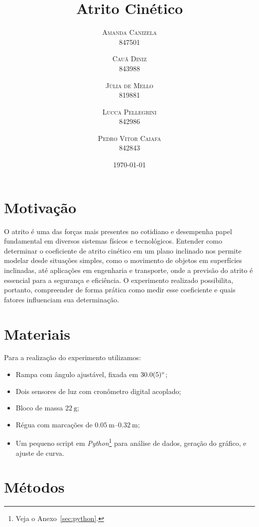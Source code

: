\documentclass[10pt,twoside,twocolumn]{article} %
\title{Atrito Cinético}
\author{
        \textsc{Amanda Canizela} \\[1ex] %
        \normalsize{847501}
        \and %
        \textsc{Cauã Diniz} \\[1ex]
        \normalsize{843988}
        \and
        \textsc{Júlia de Mello} \\[1ex]
        \normalsize{819881}
        \and
        \textsc{Lucca Pellegrini} \\[1ex]
        \normalsize{842986}
        \and
        \textsc{Pedro Vitor Caiafa} \\[1ex]
        \normalsize{842843}
}
\date{\today} %
\begin{document}


\maketitle


\section{Motivação}

O atrito é uma das forças mais presentes no cotidiano e desempenha papel
fundamental em diversos sistemas físicos e tecnológicos. Entender como
determinar o coeficiente de atrito cinético em um plano inclinado nos permite
modelar desde situações simples, como o movimento de objetos em superfícies
inclinadas, até aplicações em engenharia e transporte, onde a previsão do
atrito é essencial para a segurança e eficiência. O experimento realizado
possibilita, portanto, compreender de forma prática como medir esse coeficiente
e quais fatores influenciam sua determinação.

\section{Materiais}

Para a realização do experimento utilizamos:

\begin{itemize}
    \item Rampa com ângulo ajustável, fixada em $\SI{30 \pm 0.5}{\degree}$;
    \item Dois sensores de luz com cronômetro digital acoplado;
    \item Bloco de massa $\SI{22}{\gram}$;
	\item Régua com marcações de $\SIrange{0.05}{0.32}{\metre};$
	\item Um pequeno script em \textit{Python}\footnote{Veja o
		Anexo~\ref{sec:python}.} para análise de dados, geração do gráfico, e
		ajuste de curva.
\end{itemize}

\section{Métodos}
\end{document}
